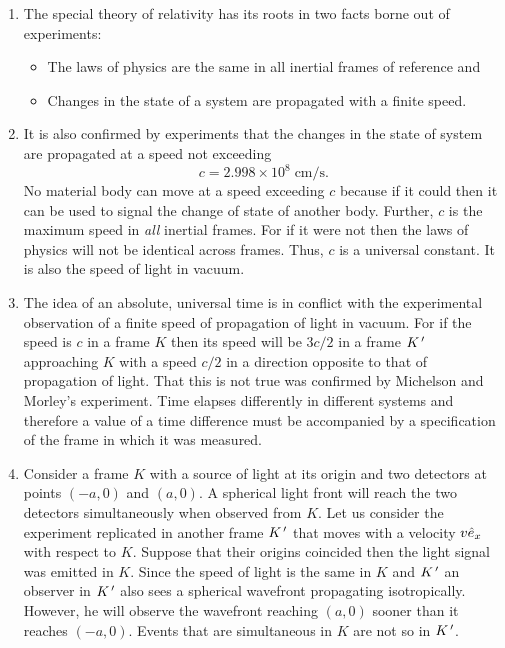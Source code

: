 \begin{enumerate}
\item The special theory of relativity has its roots in two facts borne out 
of experiments:
\begin{itemize}
\item The laws of physics are the same in all inertial frames of reference and
\item Changes in the state of a system are propagated with a finite speed.
\end{itemize}

\item It is also confirmed by experiments that the changes in the state of system 
are propagated at a speed not exceeding
\begin{equation}\label{c1e1}
c = 2.998 \times 10^8 \;\text{cm/s}.
\end{equation}
No material body can move at a speed exceeding $c$ because if it could then it
can be used to signal the change of state of another body. Further, $c$ is the
maximum speed in \emph{all} inertial frames. For if it were not then the laws of
physics will not be identical across frames. Thus, $c$ is a universal constant.
It is also the speed of light in vacuum.

\item The idea of an absolute, universal time is in conflict with the experimental 
observation of a finite speed of propagation of light in vacuum. For if the
speed is $c$ in a frame $K$ then its speed will be $3c/2$ in a frame $K^{\,\prime}$
approaching $K$ with a speed $c/2$ in a direction opposite to that of propagation
of light. That this is not true was confirmed by Michelson and Morley's experiment.
Time elapses differently in different systems and therefore a value of a time
difference must be accompanied by a specification of the frame in which it was 
measured.

\item Consider a frame $K$ with a source of light at its origin and two detectors at
points $(-a, 0)$ and $(a, 0)$. A spherical light front will reach the two 
detectors simultaneously when observed from $K$. Let us consider the experiment
replicated in another frame $K^{\,\prime}$ that moves with a velocity $v\hat{e}_{x}$ with
respect to $K$. Suppose that their origins coincided then the light signal was 
emitted in $K$. Since the speed of light is the same in $K$ and $K^{\,\prime}$ an observer
in $K^{\,\prime}$ also sees a spherical wavefront propagating isotropically. However, he
will observe the wavefront reaching $(a, 0)$ sooner than it reaches $(-a, 0)$.
Events that are simultaneous in $K$ are not so in $K^{\,\prime}$.


\end{enumerate}
